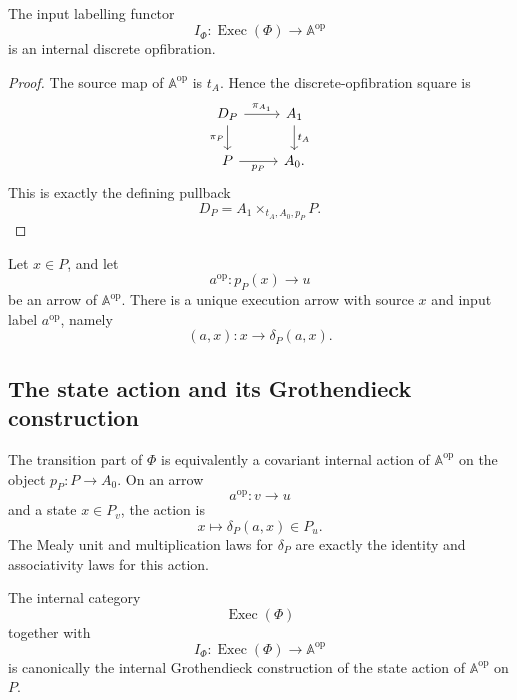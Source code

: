 \begin{theorem}
\label{thm:execution-lifting}
The input labelling functor
\[
    I_\Phi:
    \operatorname{Exec}(\Phi)
    \longrightarrow
    \mathbb A^{\mathrm{op}}
\]
is an internal discrete opfibration.
\end{theorem}

\begin{proof}
The source map of \(\mathbb A^{\mathrm{op}}\) is \(t_A\). Hence the
discrete-opfibration square is
\[
\begin{tikzcd}
    D_P
        \arrow[r,"\pi_{A_1}"]
        \arrow[d,"\pi_P"']
    &
    A_1
        \arrow[d,"t_A"]
    \\
    P
        \arrow[r,"p_P"']
    &
    A_0.
\end{tikzcd}
\]
This is exactly the defining pullback
\[
    D_P=A_1\times_{t_A,A_0,p_P}P.
\]
\end{proof}

\begin{corollary}
\label{cor:unique-one-step-lifting}
Let \(x\in P\), and let
\[
    a^{\mathrm{op}}:p_P(x)\to u
\]
be an arrow of \(\mathbb A^{\mathrm{op}}\). There is a unique execution
arrow with source \(x\) and input label \(a^{\mathrm{op}}\), namely
\[
    (a,x):x\to\delta_P(a,x).
\]
\end{corollary}

\subsection{The state action and its Grothendieck construction}
\label{subsec:state-action-grothendieck}

The transition part of \(\Phi\) is equivalently a covariant internal action
of \(\mathbb A^{\mathrm{op}}\) on the object \(p_P:P\to A_0\). On an
arrow
\[
    a^{\mathrm{op}}:v\to u
\]
and a state \(x\in P_v\), the action is
\[
    x\longmapsto\delta_P(a,x)\in P_u.
\]
The Mealy unit and multiplication laws for \(\delta_P\) are exactly the
identity and associativity laws for this action.

\begin{theorem}
\label{thm:execution-grothendieck-construction}
The internal category
\[
    \operatorname{Exec}(\Phi)
\]
together with
\[
    I_\Phi:\operatorname{Exec}(\Phi)\to\mathbb A^{\mathrm{op}}
\]
is canonically the internal Grothendieck construction of the state action of
\(\mathbb A^{\mathrm{op}}\) on \(P\).
\end{theorem}


